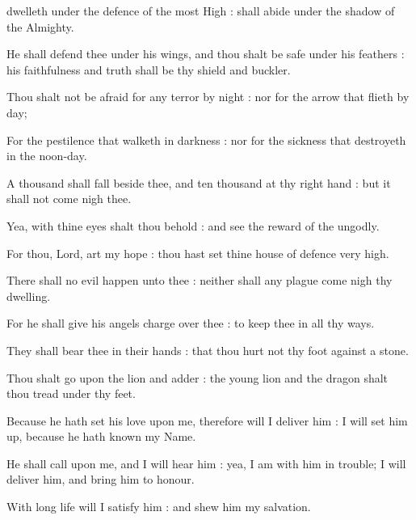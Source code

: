 
 dwelleth under the defence of the most High : shall abide under the shadow of the Almighty.\par
{}
He shall defend thee under his wings, and thou shalt be safe under his feathers : his faithfulness and truth shall be thy shield and buckler.\par
{}Thou shalt not be afraid for any terror by night : nor for the arrow that flieth by day;\par
{}For the pestilence that walketh in darkness : nor for the sickness that destroyeth in the noon-day.\par
{}A thousand shall fall beside thee, and ten thousand at thy right hand : but it shall not come nigh thee.\par
{}Yea, with thine eyes shalt thou behold : and see the reward of the ungodly.\par
{}For thou, Lord, art my hope : thou hast set thine house of defence very high.\par
{}There shall no evil happen unto thee : neither shall any plague come nigh thy dwelling.\par
{}For he shall give his angels charge over thee : to keep thee in all thy ways.\par
{}They shall bear thee in their hands : that thou hurt not thy foot against a stone.\par
{}Thou shalt go upon the lion and adder : the young lion and the dragon shalt thou tread under thy feet.\par
{}Because he hath set his love upon me, therefore will I deliver him : I will set him up, because he hath known my Name.\par
{}He shall call upon me, and I will hear him : yea, I am with him in trouble; I will deliver him, and bring him to honour.\par
{}With long life will I satisfy him : and shew him my salvation.\par


